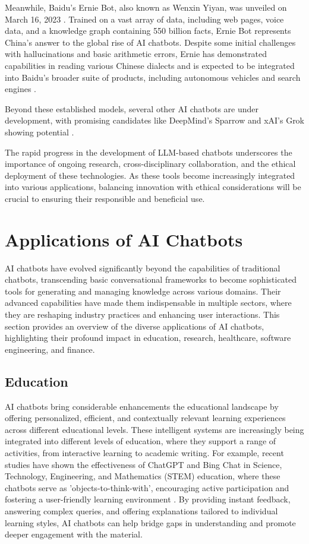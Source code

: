 Meanwhile, Baidu's Ernie Bot, also known as Wenxin Yiyan, was unveiled on March 16, 2023 \cite{motlagh2023impact}. Trained on a vast array of data, including web pages, voice data, and a knowledge graph containing 550 billion facts, Ernie Bot represents China's answer to the global rise of AI chatbots. Despite some initial challenges with hallucinations and basic arithmetic errors, Ernie has demonstrated capabilities in reading various Chinese dialects and is expected to be integrated into Baidu's broader suite of products, including autonomous vehicles and search engines \cite{yang2023baidu}.

Beyond these established models, several other AI chatbots are under development, with promising candidates like DeepMind's Sparrow and xAI's Grok showing potential \cite{rodriguez2023sparrow, wikipedia2024grok}.

The rapid progress in the development of LLM-based chatbots underscores the importance of ongoing research, cross-disciplinary collaboration, and the ethical deployment of these technologies. As these tools become increasingly integrated into various applications, balancing innovation with ethical considerations will be crucial to ensuring their responsible and beneficial use.

\section{Applications of AI Chatbots}

AI chatbots have evolved significantly beyond the capabilities of traditional chatbots, transcending basic conversational frameworks to become sophisticated tools for generating and managing knowledge across various domains. Their advanced capabilities have made them indispensable in multiple sectors, where they are reshaping industry practices and enhancing user interactions. This section provides an overview of the diverse applications of AI chatbots, highlighting their profound impact in education, research, healthcare, software engineering, and finance.

\subsection{Education}

AI chatbots bring considerable enhancements the educational landscape by offering personalized, efficient, and contextually relevant learning experiences across different educational levels. These intelligent systems are increasingly being integrated into different levels of education, where they support a range of activities, from interactive learning to academic writing. For example, recent studies have shown the effectiveness of ChatGPT and Bing Chat in Science, Technology, Engineering, and Mathematics (STEM) education, where these chatbots serve as 'objects-to-think-with', encouraging active participation and fostering a user-friendly learning environment \cite{vasconcelos2023enhancing}. By providing instant feedback, answering complex queries, and offering explanations tailored to individual learning styles, AI chatbots can help bridge gaps in understanding and promote deeper engagement with the material.

